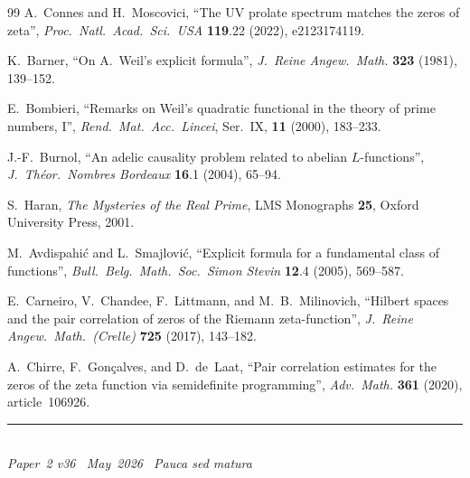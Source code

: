 \documentclass[11pt]{article}
\begin{document}
\begin{thebibliography}{99}
A.~Connes and H.~Moscovici,
``The UV prolate spectrum matches the zeros of zeta'',
\emph{Proc.\ Natl.\ Acad.\ Sci.\ USA} \textbf{119}.22 (2022),
e2123174119.

K.~Barner,
``On A.~Weil's explicit formula'',
\emph{J.\ Reine Angew.\ Math.} \textbf{323} (1981), 139--152.

E.~Bombieri,
``Remarks on Weil's quadratic functional in the theory
of prime numbers, I'',
\emph{Rend.\ Mat.\ Acc.\ Lincei}, Ser.~IX,
\textbf{11} (2000), 183--233.

J.-F.~Burnol,
``An adelic causality problem related to abelian
$L$-functions'',
\emph{J.\ Th\'eor.\ Nombres Bordeaux} \textbf{16}.1
(2004), 65--94.

S.~Haran,
\emph{The Mysteries of the Real Prime},
LMS Monographs \textbf{25}, Oxford University Press, 2001.

M.~Avdispahi\'c and L.~Smajlovi\'c,
``Explicit formula for a fundamental class of functions'',
\emph{Bull.\ Belg.\ Math.\ Soc.\ Simon Stevin}
\textbf{12}.4 (2005), 569--587.

E.~Carneiro, V.~Chandee, F.~Littmann,
and M.~B.~Milinovich,
``Hilbert spaces and the pair correlation of zeros
of the Riemann zeta-function'',
\emph{J.\ Reine Angew.\ Math.\ (Crelle)}
\textbf{725} (2017), 143--182.

A.~Chirre, F.~Gon\c{c}alves, and D.~de~Laat,
``Pair correlation estimates for the zeros of the
zeta function via semidefinite programming'',
\emph{Adv.\ Math.} \textbf{361} (2020),
article~106926.

\end{thebibliography}

\enlargethispage{3\baselineskip}
\vspace*{\fill}
\begin{minipage}{\linewidth}
\rule{\linewidth}{0.4pt}\smallskip\\
\small\emph{Paper~2 v36 \textperiodcentered\ May~2026
\textperiodcentered\ Pauca sed matura}
\end{minipage}
\end{document}

